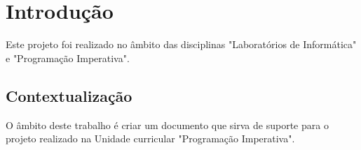 \chapter{Introdução} \label{chap:intro}

Este projeto foi realizado no âmbito das disciplinas "Laboratórios de Informática" e "Programação Imperativa".

\section{Contextualização} \label{sec:context}

O âmbito deste trabalho é criar um documento que sirva de suporte para o projeto realizado na Unidade curricular "Programação Imperativa".